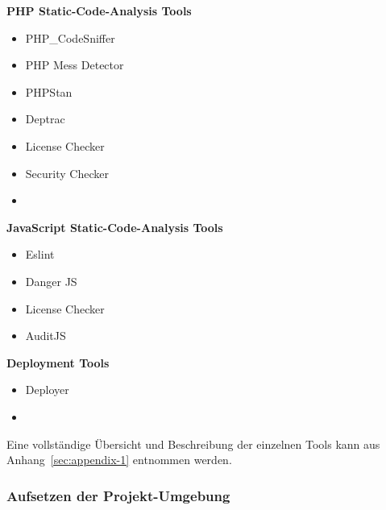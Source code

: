 \hspace{0.025\textwidth}%
\begin{minipage}{0.5\textwidth}
    \textbf{PHP Static-Code-Analysis Tools}
    \vspace{-2mm}
    \begin{itemize}
        \setlength\itemsep{0.05em}
        \item PHP\_CodeSniffer
        \item PHP Mess Detector
        \item PHPStan
        \item Deptrac
        \item License Checker
        \item Security Checker
        \item[]
    \end{itemize}
\end{minipage}
\begin{minipage}{0.475\textwidth}
    \textbf{JavaScript Static-Code-Analysis Tools}
    \vspace{-2mm}
    \begin{itemize}
        \setlength\itemsep{-0.05em}
        \item Eslint
        \item Danger JS
        \item License Checker
        \item AuditJS
    \end{itemize}
    \textbf{Deployment Tools}
    \vspace{-2mm}
    \begin{itemize}
        \item Deployer
        \item[]
    \end{itemize}
    \vspace{-4.5mm}
\end{minipage}

Eine vollständige Übersicht und Beschreibung der einzelnen Tools kann aus Anhang\ \ref{sec:appendix-1} entnommen werden.

\subsubsection{Aufsetzen der Projekt-Umgebung}

